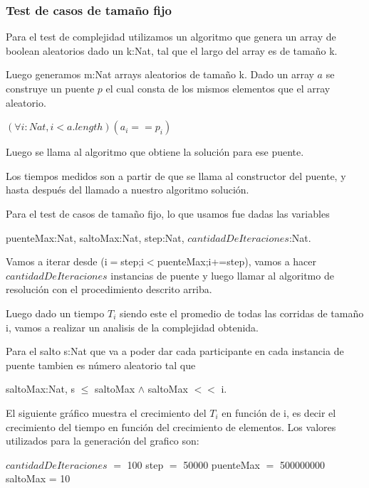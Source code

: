 \newpage



\subsubsection{Test de casos de tamaño fijo}


Para el test de complejidad utilizamos un algoritmo que genera un array de boolean aleatorios dado un k:Nat, tal que el largo del array es de tamaño k.

Luego generamos m:Nat arrays aleatorios de tamaño k. Dado un array $a$ se construye un puente $p$ el cual consta de los mismos elementos que el array aleatorio. 

$(\forall i:Nat, i < a.length)(a_{i} == p_{i})$

Luego se llama al algoritmo que obtiene la soluci\'on para ese puente.

Los tiempos medidos son a partir de que se llama al constructor del puente, y hasta despu\'es del llamado a nuestro algoritmo soluci\'on.

Para el test de casos de tamaño fijo, lo que usamos fue dadas las variables 

puenteMax:Nat, saltoMax:Nat, step:Nat, $cantidadDeIteraciones$:Nat. 

Vamos a iterar desde (i$=$step;i$<$puenteMax;i+=step), vamos a hacer $cantidadDeIteraciones$ instancias de puente y luego llamar al algoritmo de resoluci\'on con el procedimiento descrito arriba.

Luego dado un tiempo $T_{i}$ siendo este el promedio de todas las corridas de tamaño i, vamos a realizar un analisis de la complejidad obtenida.

Para el salto s:Nat que va a poder dar cada participante en cada instancia de puente tambien es n\'umero aleatorio tal que

saltoMax:Nat, s $\leq$ saltoMax $\wedge$ saltoMax $<<$ i.

El siguiente gr\'afico muestra el crecimiento del $T_{i}$ en funci\'on de i, es decir el crecimiento del tiempo en funci\'on del crecimiento de elementos.
Los valores utilizados para la generaci\'on del grafico son:

\newpage

$cantidadDeIteraciones$ $=$ 100 step $=$ 50000 puenteMax $=$ 500000000 saltoMax = 10

